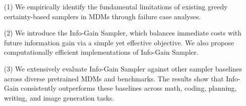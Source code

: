 

{(1) }We empirically identify the fundamental limitations of existing greedy certainty-based samplers in MDMs through failure case analyses.

{(2) }We introduce the Info-Gain Sampler, which balances immediate costs with future information gain via a simple yet effective objective. We also propose computationally efficient implementations of Info-Gain Sampler.

{(3) }We extensively evaluate Info-Gain Sampler against other sampler baselines across diverse pretrained MDMs and benchmarks. The results show that Info-Gain consistently outperforms these baselines across math, coding, planning, writing, and image generation tasks.
